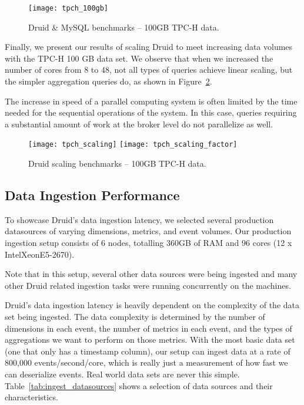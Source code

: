 \documentclass{sig-alternate-2013}
\begin{document}
\begin{figure}
\centering
\texttt{[image: tpch\_100gb]}
\caption{Druid \& MySQL benchmarks -- 100GB TPC-H data.}
\label{fig:tpch_100gb}
\end{figure}

Finally, we present our results of scaling Druid to meet increasing data
volumes with the TPC-H 100 GB data set. We observe that when we
increased the number of cores from 8 to 48, not all types of queries
achieve linear scaling, but the simpler aggregation queries do,
as shown in Figure~\ref{fig:tpch_scaling}.

The increase in speed of a parallel computing system is often limited by the
time needed for the sequential operations of the system. In this case, queries
requiring a substantial amount of work at the broker level do not parallelize as
well.

\begin{figure}
\centering
\texttt{[image: tpch\_scaling]}
\texttt{[image: tpch\_scaling\_factor]}
\caption{Druid scaling benchmarks -- 100GB TPC-H data.}
\label{fig:tpch_scaling}
\end{figure}

\subsection{Data Ingestion Performance}
To showcase Druid's data ingestion latency, we selected several production
datasources of varying dimensions, metrics, and event volumes. Our production
ingestion setup consists of 6 nodes, totalling 360GB of RAM and 96 cores
(12 x Intel\textsuperscript\textregistered Xeon\textsuperscript\textregistered E5-2670).

Note that in this setup, several other data sources were being ingested and
many other Druid related ingestion tasks were running concurrently on the machines.

Druid's data ingestion latency is heavily dependent on the complexity of the
data set being ingested. The data complexity is determined by the number of
dimensions in each event, the number of metrics in each event, and the types of
aggregations we want to perform on those metrics. With the most basic data set
(one that only has a timestamp column), our setup can ingest data at a rate of
800,000 events/second/core, which is really just a measurement of how fast we can
deserialize events. Real world data sets are never this simple.
Table~\ref{tab:ingest_datasources} shows a selection of data sources and their
characteristics.
\end{document}
